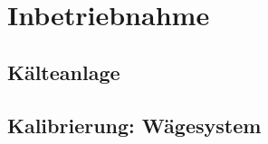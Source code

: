 \chapter{Inbetriebnahme}
\label{cha:Inbetriebnahme}


\section{Kälteanlage}
\label{sec:Inbetriebnahme_KA}


\section{Kalibrierung: Wägesystem}
\label{sec:Kalibrierung Wägesystem}
